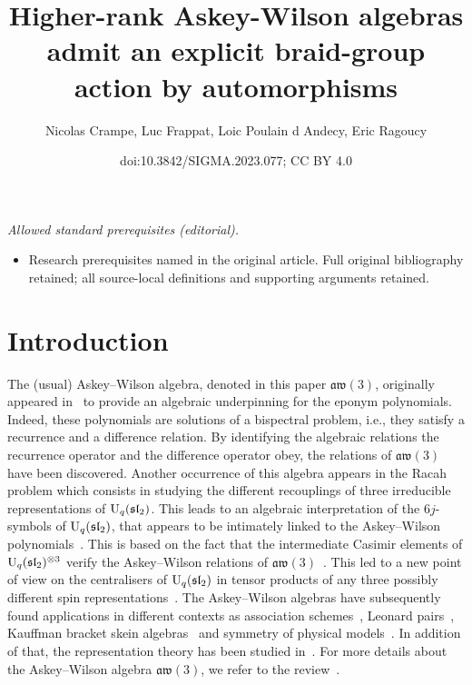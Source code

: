 \documentclass[10pt,a4paper]{amsart}
\title{Higher-rank Askey-Wilson algebras admit an explicit braid-group action by automorphisms}
\author{Nicolas Crampe, Luc Frappat, Loic Poulain d Andecy, Eric Ragoucy}
\date{doi:10.3842/SIGMA.2023.077; CC BY 4.0}
\numberwithin{equation}{section}
\theoremstyle{definition}
\begin{document}
\maketitle
\noindent\textit{Allowed standard prerequisites (editorial).}\begin{itemize}
\item Research prerequisites named in the original article. Full original bibliography retained; all source-local definitions and supporting arguments retained.
\end{itemize}\medskip
\section{Introduction}

The (usual) Askey--Wilson algebra, denoted in this paper $\mathfrak{aw}(3)$, originally appeared in~\cite{Zh} to provide an algebraic
underpinning for the eponym polynomials. Indeed, these polynomials are solutions of a bispectral problem, i.e., they satisfy a recurrence and a difference relation.
By identifying the algebraic relations the recurrence operator and the difference operator obey, the relations of $\mathfrak{aw}(3)$ have been discovered.
Another occurrence of this algebra appears in the Racah problem which consists in studying the different recouplings of three irreducible representations of ${\rm U}_q(\mathfrak{sl}_2)$. This leads to an algebraic interpretation of the $6j$-symbols of ${\rm U}_q(\mathfrak{sl}_2)$, that appears to be intimately linked to the Askey–Wilson polynomials~\cite{Zh2,GZ}.
 This is based on the fact that the intermediate Casimir elements of ${\rm U}_q(\mathfrak{sl}_2)^{\otimes 3}$ verify the Askey–Wilson relations of $\mathfrak{aw}(3)$~\cite{Hua3}.
 This led to a new point of view on the centralisers of ${\rm U}_q(\mathfrak{sl}_2)$ in tensor products of any three possibly different spin representations~\cite{CPVZ, CVZ2}.
The Askey--Wilson algebras have subsequently found applications in different contexts as association schemes~\cite{BI,Leo,Ter}, Leonard pairs~\cite{TV}, Kauffman bracket skein algebras~\cite{CL}
and symmetry of physical models~\cite{GVZ, KKM,Post}. In addition of that, the representation theory has been studied in~\cite{Hua2}. For more details about the Askey--Wilson algebra $\mathfrak{aw}(3)$, we refer to the review~\cite{avatar}.
\end{document}
